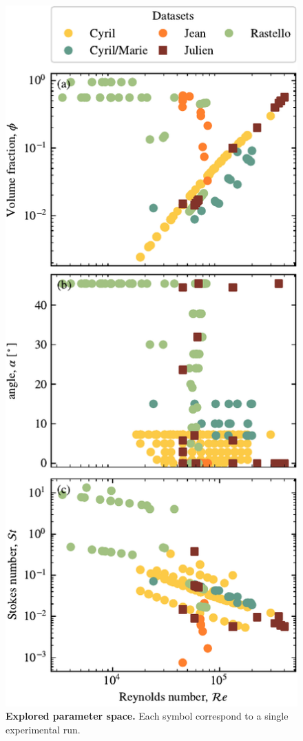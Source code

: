 \documentclass[twocolumn]{article}
\begin{document}
\begin{figure}
	\centering
	\includegraphics{figure2.pdf}
	\caption{\textbf{Explored parameter space.} Each symbol correspond to a single experimental run.}
	\label{fig:fig2}
\end{figure}
\end{document}
